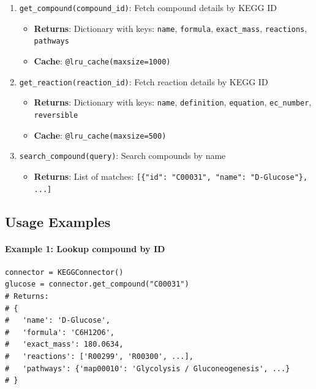 \begin{enumerate}
    \item \texttt{get\_compound(compound\_id)}: Fetch compound details by KEGG ID
    \begin{itemize}
        \item \textbf{Returns}: Dictionary with keys: \texttt{name}, \texttt{formula}, \texttt{exact\_mass}, \texttt{reactions}, \texttt{pathways}
        \item \textbf{Cache}: \texttt{@lru\_cache(maxsize=1000)}
    \end{itemize}
    
    \item \texttt{get\_reaction(reaction\_id)}: Fetch reaction details by KEGG ID
    \begin{itemize}
        \item \textbf{Returns}: Dictionary with keys: \texttt{name}, \texttt{definition}, \texttt{equation}, \texttt{ec\_number}, \texttt{reversible}
        \item \textbf{Cache}: \texttt{@lru\_cache(maxsize=500)}
    \end{itemize}
    
    \item \texttt{search\_compound(query)}: Search compounds by name
    \begin{itemize}
        \item \textbf{Returns}: List of matches: \texttt{[\{"id": "C00031", "name": "D-Glucose"\}, ...]}
    \end{itemize}
\end{enumerate}

\subsection{Usage Examples}
\label{subsec:kegg-connector-usage}

\paragraph{Example 1: Lookup compound by ID}

\begin{verbatim}
connector = KEGGConnector()
glucose = connector.get_compound("C00031")
# Returns:
# {
#   'name': 'D-Glucose',
#   'formula': 'C6H12O6',
#   'exact_mass': 180.0634,
#   'reactions': ['R00299', 'R00300', ...],
#   'pathways': {'map00010': 'Glycolysis / Gluconeogenesis', ...}
# }
\end{verbatim}

